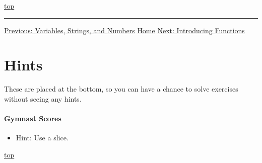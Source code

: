\documentclass[11pt]{article}
\providecommand{\tightlist}{%
      \setlength{\itemsep}{0pt}\setlength{\parskip}{0pt}}
\begin{document}
    \protect\hyperlink{}{top}

    \begin{center}\rule{0.5\linewidth}{0.5pt}\end{center}

\href{http://nbviewer.ipython.org/urls/raw.github.com/ehmatthes/intro_programming/master/notebooks/var_string_num.ipynb}{Previous:
Variables, Strings, and Numbers} \textbar{}
\href{http://nbviewer.ipython.org/urls/raw.github.com/ehmatthes/intro_programming/master/notebooks/index.ipynb}{Home}
\textbar{}
\href{http://nbviewer.ipython.org/urls/raw.github.com/ehmatthes/intro_programming/master/notebooks/introducing_functions.ipynb}{Next:
Introducing Functions}

    \hypertarget{hints}{%
\section{Hints}\label{hints}}

These are placed at the bottom, so you can have a chance to solve
exercises without seeing any hints.

\hypertarget{gymnast-scores}{%
\paragraph{Gymnast Scores}\label{gymnast-scores}}

\begin{itemize}
\tightlist
\item
  Hint: Use a slice.
\end{itemize}

    \protect\hyperlink{}{top}


    
    
    
\end{document}

